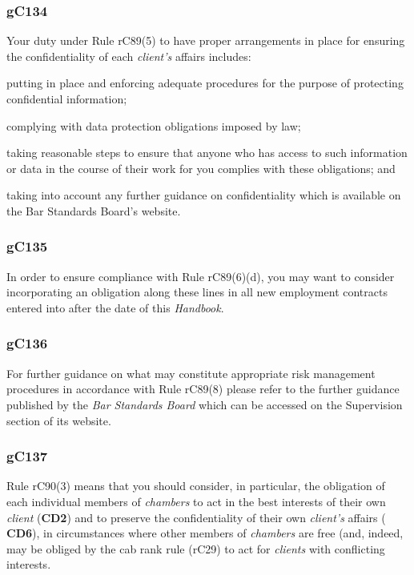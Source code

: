\subsubsection{\color{darkgrey}gC134}

Your duty under Rule rC89(5) to have proper arrangements in place for
ensuring the confidentiality of each \emph{client's} affairs includes:
\begin{numlist}
\item putting in place and enforcing adequate procedures for the purpose of
protecting confidential information;

\item complying with data protection obligations imposed by law;

\item taking reasonable steps to ensure that anyone who has access to such
information or data in the course of their work for you complies with
these obligations; and \item taking into account any further guidance on
confidentiality which is available on the Bar Standards Board's website.\end{numlist}

\subsubsection{\color{darkgrey}gC135}

In order to ensure compliance with Rule rC89(6)(d), you may want to
consider incorporating an obligation along these lines in all new
employment contracts entered into after the date of this
\emph{Handbook}.

\subsubsection{\color{darkgrey}gC136}

For further guidance on what may constitute appropriate risk management
procedures in accordance with Rule rC89(8) please refer to the further
guidance published by the \emph{Bar Standards Board} which can be
accessed on the Supervision section of its website.

\subsubsection{\color{darkgrey}gC137}

Rule rC90(3) means that you should consider, in particular, the
obligation of each individual members of \emph{chambers} to act in the
best interests of their own \emph{client} (\textcolor{mygold}{\textbf{CD2}}) and to preserve the
confidentiality of their own \emph{client's} affairs ( \textbf{\textcolor{mygold}{CD6}}), in
circumstances where other members of \emph{chambers} are free (and,
indeed, may be obliged by the cab rank rule (rC29) to act for
\emph{clients} with conflicting interests.

